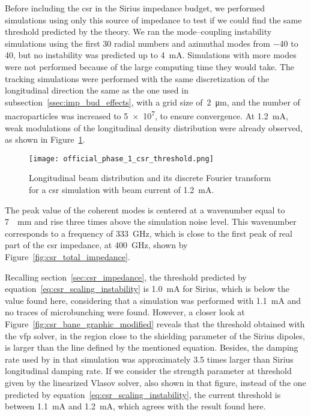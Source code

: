     Before including the \gls{csr} in the Sirius impedance budget, we performed simulations using only this source of impedance to test if we could find the same threshold predicted by the theory. We ran the mode--coupling instability simulations using the first \num{30} radial numbers and  azimuthal modes from \num{-40} to \num{40}, but no instability was predicted up to \SI{4}{\milli\ampere}. Simulations with more modes were not performed because of the large computing time they would take. The tracking simulations were performed with the same discretization of the longitudinal direction the same as the one used in subsection~\ref{ssec:imp_bud_effects}, with a grid size of~\SI{2}{\micro\meter}, and the number of macroparticles was increased to \num{5e7}, to ensure convergence. At \SI{1.2}{\milli\ampere}, weak modulations of the longitudinal density distribution were already observed, as shown in Figure~\ref{fig:ph1_csr_threshold}.
    \begin{figure}
        \centering
        \texttt{[image: official\_phase\_1\_csr\_threshold.png]}
        \caption{Longitudinal beam distribution and its discrete Fourier transform for a \gls{csr} simulation with beam current of \SI{1.2}{\milli\ampere}.}
        \label{fig:ph1_csr_threshold}
    \end{figure}
    The peak value of the coherent modes is centered at a wavenumber equal to \SI{7}{\per\milli\meter} and rise three times above the simulation noise level. This wavenumber corresponds to a frequency of \SI{333}{\giga\hertz}, which is close to the first peak of real part of the \gls{csr} impedance, at \SI{400}{\giga\hertz}, shown by Figure~\ref{fig:csr_total_impedance}.

    Recalling section~\ref{sec:csr_impedance}, the threshold predicted by equation~\eqref{eq:csr_scaling_instability} is \SI{1.0}{\milli\ampere} for Sirius, which is below the value found here, considering that a simulation was performed with \SI{1.1}{\milli\ampere} and no traces of microbunching were found.
    However, a closer look at Figure~\ref{fig:csr_bane_graphic_modified} reveals that the threshold obtained with the \gls{vfp} solver, in the region close to the shielding parameter of the Sirius dipoles, is larger than the line defined by the mentioned equation. Besides, the damping rate used by  in that simulation was approximately \num{3.5} times larger than Sirius longitudinal damping rate. If we consider the strength parameter at threshold given by the linearized Vlasov solver, also shown in that figure, instead of the one predicted by equation~\eqref{eq:csr_scaling_instability}, the current threshold is between \SI{1.1}{\milli\ampere} and \SI{1.2}{\milli\ampere}, which agrees with the result found here.

